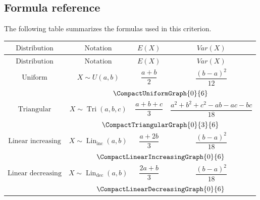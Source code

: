 	\subsection{Formula reference}\label{sec:c4-intro-formulas}
	
	The following table summarizes the formulas used in this criterion.
	
	{
		\renewcommand{\arraystretch}{1.9}
		
		\begin{longtable}{c|c|c|c}
			$\text{Distribution}$
			&
			$\text{Notation}$
			&
			$E(X)$
			&
			$Var(X)$
			\\[1mm]
			\hline
			\endfirsthead
			
			$\text{Distribution}$
			&
			$\text{Notation}$
			&
			$E(X)$
			&
			$Var(X)$
			\\[1mm]
			\hline
			\endhead
			
			\hline
			\endfoot
			
			$\text{Uniform}$
			&
			$X\sim U(a,b)$
			&
			$\dfrac{a+b}{2}$
			&
			$\dfrac{(b-a)^2}{12}$
			\\[2mm]
			
			&
			\multicolumn{3}{c}{
				$\vcenter{\hbox{\CompactUniformGraph{0}{6}}}$
			}
			\\[5mm]
			\hline
			
			$\text{Triangular}$
			&
			$X\sim \operatorname{Tri}(a,b,c)$
			&
			$\dfrac{a+b+c}{3}$
			&
			$\dfrac{a^2+b^2+c^2-ab-ac-bc}{18}$
			\\[2mm]
			
			&
			\multicolumn{3}{c}{
				$\vcenter{\hbox{\CompactTriangularGraph{0}{3}{6}}}$
			}
			\\[5mm]
			\hline
			
			$\text{Linear increasing}$
			&
			$X\sim \operatorname{Lin}_{\mathrm{inc}}(a,b)$
			&
			$\dfrac{a+2b}{3}$
			&
			$\dfrac{(b-a)^2}{18}$
			\\[2mm]
			
			&
			\multicolumn{3}{c}{
				$\vcenter{\hbox{\CompactLinearIncreasingGraph{0}{6}}}$
			}
			\\[5mm]
			\hline
			
			$\text{Linear decreasing}$
			&
			$X\sim \operatorname{Lin}_{\mathrm{dec}}(a,b)$
			&
			$\dfrac{2a+b}{3}$
			&
			$\dfrac{(b-a)^2}{18}$
			\\[2mm]
			
			&
			\multicolumn{3}{c}{
				$\vcenter{\hbox{\CompactLinearDecreasingGraph{0}{6}}}$
			}
			\\[5mm]
			\hline
			

\end{longtable}}

